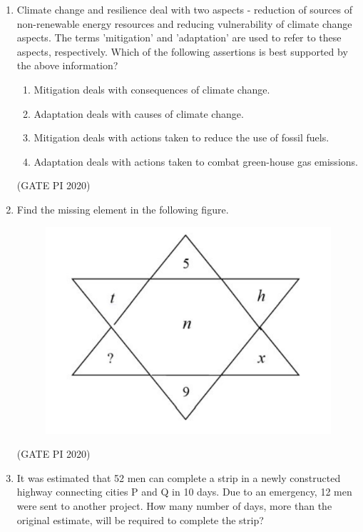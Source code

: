\documentclass[journal,12pt,onecolumn]{IEEEtran}
\theoremstyle{remark}
\begin{document}
\begin{enumerate}
\item Climate change and resilience deal with two aspects \-- reduction of sources of non-renewable energy resources and reducing vulnerability of climate change aspects. The terms 'mitigation' and 'adaptation' are used to refer to these aspects, respectively.
Which of the following assertions is best supported by the above information?
\begin{enumerate}
    \item Mitigation deals with consequences of climate change.
    \item Adaptation deals with causes of climate change.
    \item Mitigation deals with actions taken to reduce the use of fossil fuels.
    \item Adaptation deals with actions taken to combat green-house gas emissions.
\end{enumerate}

\hfill (GATE PI 2020)

\item Find the missing element in the following figure.

\begin{figure}[h]
    \centering
    \includegraphics[width=0.5\columnwidth]{figs/fig2.png}
    \caption{}
    \label{fig:placeholder}
\end{figure} 


\begin{enumerate}
\end{enumerate}

\hfill (GATE PI 2020)

\item It was estimated that 52 men can complete a strip in a newly constructed highway connecting cities P and Q in 10 days. Due to an emergency, 12 men were sent to another project. How many number of days, more than the original estimate, will be required to complete the strip?
\begin{enumerate}
\end{enumerate}


\end{enumerate}
\end{document}
